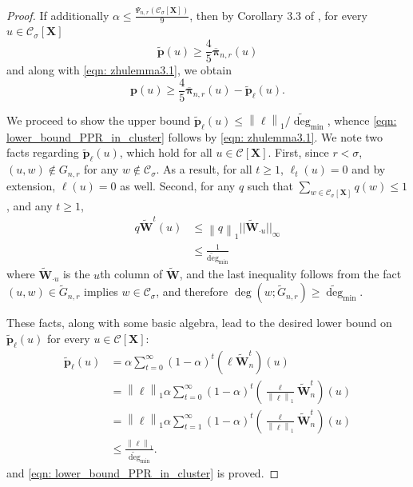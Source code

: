 \documentclass{article}
\newcommand{\norm}[1]{\left\lVert#1\right\rVert}
\newcommand{\1}{\mathbf{1}}
\newcommand{\degminwt}{\widetilde{\deg}_{\min}}
\newcommand{\pbf}{\mathbf{p}}
\newcommand{\pibf}{\bm{\pi}}
\newcommand{\Xbf}{\mathbf{X}}
\newcommand{\Wbf}{\mathbf{W}}
\newcommand{\Cset}{\mathcal{C}}
\newcommand{\Csig}{\Cset_{\sigma}}
\theoremstyle{aldenthm}
\begin{document}
\begin{proof}
	If additionally $\alpha \leq \frac{\Psi_{n,r}(\Csig[\Xbf])}{9}$, then by Corollary 3.3 of \citep{zhu2013}, for every $u \in \Csig[\Xbf]$
	\begin{equation*}
	\widetilde{\pbf}(u) \geq \frac{4}{5} \overline{\pibf}_{n,r}(u)
	\end{equation*}
	and along with \eqref{eqn: zhulemma3.1}, we obtain
	\begin{equation*}
	\pbf(u) \geq \frac{4}{5} \overline{\pibf}_{n,r}(u) - \widetilde{\pbf}_{\ell}(u).
	\end{equation*}
	
	We proceed to show the upper bound $\widetilde{\pbf}_{\ell}(u) \leq \norm{\ell}_1 / \degminwt$, whence \eqref{eqn: lower_bound_PPR_in_cluster} follows by \eqref{eqn: zhulemma3.1}. We note two facts regarding $\widetilde{\pbf}_{\ell}(u)$, which hold for all $u \in \Cset[\Xbf]$. First, since $r < \sigma$, $(u,w) \not\in G_{n,r}$ for any $w \not\in \Csig$. As a result, for all $t \geq 1$, $\ell_t(u) = 0$ and by extension, $\ell(u) = 0$ as well. Second, for any $q$ such that $\sum_{w \in \Csig[\Xbf]} q(w) \leq 1$, and any $t \geq 1$,
	\begin{align}
	\label{eqn: one_step_bound}
	q \widetilde{\Wbf}^t (u) & \leq \norm{q}_1 ||\widetilde{\Wbf}_{\cdot u}||_{\infty} \nonumber \\
	& \leq \frac{1}{\degminwt} 
	\end{align}
	where $\widetilde{\Wbf}_{\cdot u}$ is the $u$th column of $\widetilde{\Wbf}$, and the last inequality follows from the fact $(u,w) \in \widetilde{G}_{n,r}$ implies $w \in \Csig$, and therefore $\deg(w; \widetilde{G}_{n,r}) \geq \degminwt$.
	
	These facts, along with some basic algebra, lead to the desired lower bound on $\widetilde{\pbf}_{\ell}(u)$ for every $u \in \Cset[\Xbf]$:
	\begin{align*}
	\widetilde{\pbf}_{\ell}(u) & = \alpha \sum_{t = 0}^{\infty} (1 - \alpha)^t \left(\ell \widetilde{\Wbf}_n^t \right)(u)  \nonumber \\
	& = \norm{\ell}_1 \alpha \sum_{t = 0}^{\infty} (1 - \alpha)^t \left(\frac{\ell}{\norm{\ell}_1}  \widetilde{\Wbf}_n^t \right)(u)\nonumber \\
	& = \norm{\ell}_1 \alpha \sum_{t = 1}^{\infty} (1 - \alpha)^t \left(\frac{\ell}{\norm{\ell}_1}  \widetilde{\Wbf}_n^t \right)(u)\nonumber \\
	& \leq \frac{\norm{\ell}_1 }{\degminwt}.
	\end{align*}
	and \eqref{eqn: lower_bound_PPR_in_cluster} is proved.
	

\end{proof}
\end{document}
